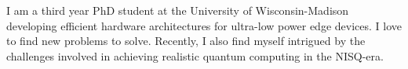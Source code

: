 

\begin{cvparagraph}

I am a third year PhD student at the University of Wisconsin-Madison developing efficient hardware architectures for ultra-low power edge devices. I love to find new problems to solve. Recently, I also find myself intrigued by the challenges involved in achieving realistic quantum computing in the NISQ-era.
\end{cvparagraph}
